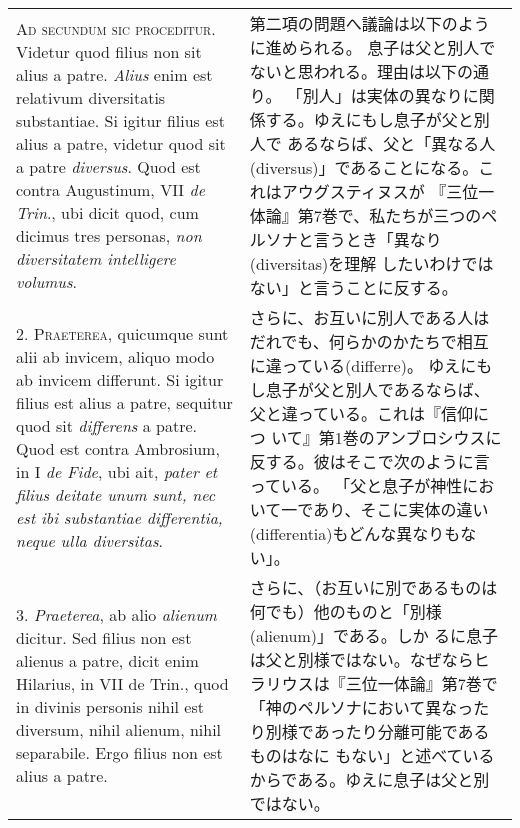 \documentclass[10pt]{jsarticle} %
\begin{document}
\begin{longtable}{p{21em}p{21em}}

{\scshape Ad secundum sic proceditur}. Videtur quod filius non sit alius a
patre. {\itshape Alius} enim est relativum diversitatis substantiae. Si igitur
filius est alius a patre, videtur quod sit a patre {\itshape diversus}. Quod est
contra Augustinum, VII {\itshape de Trin}., ubi dicit quod, cum dicimus tres
personas, {\itshape non diversitatem intelligere volumus}.


&

第二項の問題へ議論は以下のように進められる。
息子は父と別人でないと思われる。理由は以下の通り。
「別人」は実体の異なりに関係する。ゆえにもし息子が父と別人で
 あるならば、父と「異なる人(diversus)」であることになる。これはアウグスティヌスが
 『三位一体論』第7巻で、私たちが三つのペルソナと言うとき「異なり(diversitas)を理解
 したいわけではない」と言うことに反する。


\\

2. {\scshape Praeterea}, quicumque sunt alii ab invicem, aliquo modo ab invicem
differunt. Si igitur filius est alius a patre, sequitur quod sit
{\itshape differens} a patre. Quod est contra Ambrosium, in I {\itshape de Fide}, ubi ait,
{\itshape pater et filius deitate unum sunt, nec est ibi substantiae
differentia, neque ulla diversitas}.

&

さらに、お互いに別人である人はだれでも、何らかのかたちで相互に違っている(differre)。
 ゆえにもし息子が父と別人であるならば、父と違っている。これは『信仰につ
 いて』第1巻のアンブロシウスに反する。彼はそこで次のように言っている。
 「父と息子が神性において一であり、そこに実体の違い(differentia)もどんな異なりもな
 い」。

\\



3. {\itshape Praeterea}, ab alio {\itshape alienum} dicitur. Sed filius non est alienus a
patre, dicit enim Hilarius, in VII de Trin., quod in divinis personis
nihil est diversum, nihil alienum, nihil separabile. Ergo filius non
est alius a patre.


&

さらに、（お互いに別であるものは何でも）他のものと「別様(alienum)」である。しか
 るに息子は父と別様ではない。なぜならヒラリウスは『三位一体論』第7巻で
 「神のペルソナにおいて異なったり別様であったり分離可能であるものはなに
 もない」と述べているからである。ゆえに息子は父と別ではない。


\end{longtable}
\end{document}
